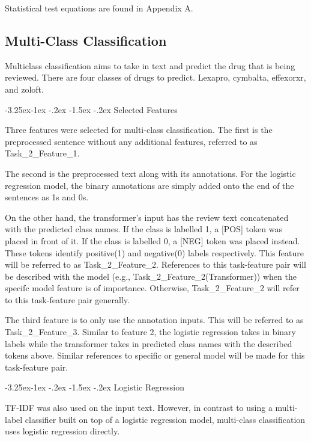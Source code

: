 \documentclass[10.7pt, twocolumn]{article}
\makeatletter
\renewcommand\subsubsection{\@startsection{subsubsection}{3}{\z@}%
	{-3.25ex\@plus -1ex \@minus -.2ex}%
    {-1.5ex \@plus -.2ex}%
    {\normalfont\itshape}}
\makeatother
\begin{document}
Statistical test equations are found in Appendix A.
\subsection{Multi-Class Classification}
Multiclass classification aims to take in text and predict the drug that is being reviewed. There are four classes of drugs to predict. Lexapro, cymbalta, effexorxr, and zoloft.

\subsubsection{Selected Features}

Three features were selected for multi-class classification. The first is the preprocessed sentence without any additional features, referred to as Task\_2\_Feature\_1. 

The second is the preprocessed text along with its annotations. For the logistic regression model, the binary annotations are simply added onto the end of the sentences as 1s and 0s. 

On the other hand, the transformer's input has the review text concatenated with the predicted class names. If the class is labelled 1, a [POS] token was placed in front of it. If the class is labelled 0, a [NEG] token was placed instead. These tokens identify positive(1) and negative(0) labels respectively. This feature will be referred to as Task\_2\_Feature\_2. References to this task-feature pair will be described with the model (e.g., Task\_2\_Feature\_2(Transformer)) when the specifc model feature is of importance. Otherwise, Task\_2\_Feature\_2 will refer to this task-feature pair generally.

The third feature is to only use the annotation inputs. This will be referred to as Task\_2\_Feature\_3. Similar to feature 2, the logistic regression takes in binary labels while the transformer takes in predicted class names with the described tokens above. Similar references to specific or general model will be made for this task-feature pair.

\subsubsection{Logistic Regression}

TF-IDF was also used on the input text. However, in contrast to using a multi-label classifier built on top of a logistic regression model, multi-class classification uses logistic regression directly.
\end{document}
